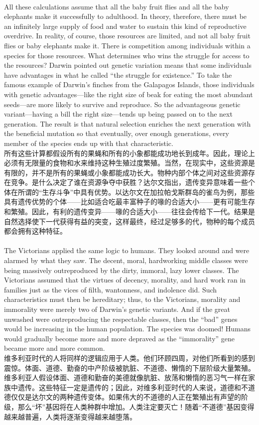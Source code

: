 \documentclass{article}
\begin{document}
\\
All these calculations assume that all the baby fruit flies and all the baby elephants make it successfully to adulthood. In theory, therefore, there must be an infinitely large supply of food and water to sustain this kind of reproductive overdrive. In reality, of course, those resources are limited, and not all baby fruit flies or baby elephants make it. There is competition among individuals within a species for those resources. What determines who wins the struggle for access to the resources? Darwin pointed out genetic variation means that some individuals have advantages in what he called “the struggle for existence.” To take the famous example of Darwin’s finches from the Galapagos Islands, those individuals with genetic advantages—like the right size of beak for eating the most abundant seeds—are more likely to survive and reproduce. So the advantageous genetic variant—having a bill the right size—tends up being passed on to the next generation. The result is that natural selection enriches the next generation with the beneficial mutation so that eventually, over enough generations, every member of the species ends up with that characteristic.\\
所有这些计算都假设所有的果蝇和所有的小象都能成功地长到成年。因此，理论上必须有无限量的食物和水来维持这种生殖过度繁殖。当然，在现实中，这些资源是有限的，并不是所有的果蝇或小象都能成功长大。物种内部个体之间对这些资源存在竞争。是什么决定了谁在资源争夺中获胜？达尔文指出，遗传变异意味着一些个体在所谓的“生存斗争”中具有优势。以达尔文在加拉帕戈斯群岛的雀鸟为例，那些具有遗传优势的个体——比如适合吃最丰富种子的喙的合适大小——更有可能生存和繁殖。因此，有利的遗传变异——喙的合适大小——往往会传给下一代。结果是自然选择使下一代获得有益的突变，这样最终，经过足够多的代，物种的每个成员都会拥有这种特征。\\

\\
The Victorians applied the same logic to humans. They looked around and were alarmed by what they saw. The decent, moral, hardworking middle classes were being massively outreproduced by the dirty, immoral, lazy lower classes. The Victorians assumed that the virtues of decency, morality, and hard work ran in families just as the vices of filth, wantonness, and indolence did. Such characteristics must then be hereditary; thus, to the Victorians, morality and immorality were merely two of Darwin’s genetic variants. And if the great unwashed were outreproducing the respectable classes, then the “bad” genes would be increasing in the human population. The species was doomed! Humans would gradually become more and more depraved as the “immorality” gene became more and more common.\\
维多利亚时代的人将同样的逻辑应用于人类。他们环顾四周，对他们所看到的感到震惊。体面、道德、勤奋的中产阶级被肮脏、不道德、懒惰的下层阶级大量繁殖。维多利亚人假设体面、道德和勤奋的美德就像肮脏、放荡和懒惰的恶习气一样在家族中遗传。这些特征一定是遗传的；因此，对维多利亚时代的人来说，道德和不道德仅仅是达尔文的两种遗传变体。如果伟大的不道德的人正在繁殖出有声望的阶级，那么“坏”基因将在人类种群中增加。人类注定要灭亡！随着“不道德”基因变得越来越普遍，人类将逐渐变得越来越堕落。\\
\end{document}
